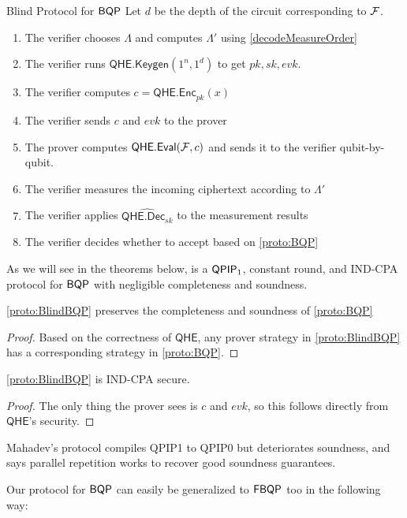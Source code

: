 \begin{protocol}{Blind Protocol for $\operatorname{\mathsf{BQP}}$}
	\label{proto:BlindBQP}
	Let $d$ be the depth of the circuit corresponding to $\mathcal{F}$.
	\begin{enumerate}
		\item The verifier chooses $\Lambda$ and computes $\Lambda'$ using \cref{decodeMeasureOrder}
		\item The verifier runs $\mathsf{QHE.Keygen}(1^n, 1^d)$ to get $pk, sk, evk$.
		\item The verifier computes $c=\mathsf{QHE.Enc}_{pk}(x)$
		\item The verifier sends $c$ and $evk$ to the prover
		\item The prover computes $\mathsf{QHE.Eval}(\mathcal{F}, c)$ and sends it to the verifier qubit-by-qubit.
		\item The verifier measures the incoming ciphertext according to $\Lambda'$
		\item The verifier applies $\widehat{\mathsf{QHE.Dec}_{sk}}$ to the measurement results
		\item The verifier decides whether to accept based on \cref{proto:BQP}
	\end{enumerate}
\end{protocol}

As we will see in the theorems below,  is a $\operatorname{\mathsf{QPIP}}_1$, constant round, and IND-CPA protocol for $\operatorname{\mathsf{BQP}}$ with negligible completeness and soundness.

\begin{thm}
	\cref{proto:BlindBQP} preserves the completeness and soundness of \cref{proto:BQP}
\end{thm}
\begin{proof}
	Based on the correctness of $\mathsf{QHE}$, any prover strategy in \cref{proto:BlindBQP} has a corresponding strategy in \cref{proto:BQP}.
\end{proof}

\begin{thm}
	\cref{proto:BlindBQP} is IND-CPA secure.
\end{thm}
\begin{proof}
	The only thing the prover sees is $c$ and $evk$, so this follows directly from $\mathsf{QHE}$'s security.
\end{proof}

Mahadev's protocol compiles QPIP1 to QPIP0 but deteriorates soundness, and \cite{parallelrep} says parallel repetition works to recover good soundness guarantees.

\begin{rmk}
	Our protocol for $\operatorname{\mathsf{BQP}}$ can easily be generalized to $\operatorname{\mathsf{FBQP}}$ too in the following way:
\end{rmk}


